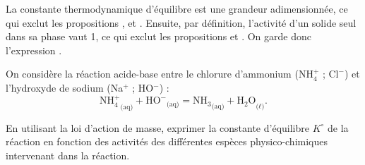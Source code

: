 \begin{corrigeNewpage}
La constante thermodynamique d'équilibre est une grandeur adimensionnée, ce qui exclut les propositions \reponseB{}, \reponseD{} et \reponseF{}. Ensuite, par définition, l'activité d'un solide seul dans sa phase vaut 1, ce qui exclut les propositions \reponseA{} et \reponseC{}. On garde donc l'expression \reponseE{}.
\end{corrigeNewpage}


\finEntrainement








\hauteurLargeurCadreReponse		{11mm}{5cm}
\typeEntrainement				{} %
\initialisationEntrainement

On considère la réaction acide-base entre le chlorure d'ammonium ($\mathrm{NH^+_4}$ ; $\mathrm{Cl^-}$) et l'hydroxyde de sodium (Na$^+$ ; HO$^-$) :
\[
\mathrm{NH^+_4}_\text{(aq)}+\mathrm{HO^-}_\text{(aq)}=
\mathrm{NH_3}_\text{(aq)}+\mathrm{H_2O}_\text{($\ell$)}.
\]
\debutEntrainement


\begin{enonce}
En utilisant la loi d'action de masse, exprimer la constante d'équilibre $K^\circ$ de la réaction en fonction des activités des différentes espèces physico-chimiques intervenant dans la réaction.

\end{enonce}


